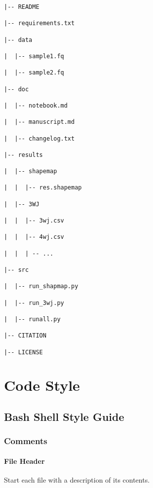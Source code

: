 \documentclass[
]{book}
\begin{document}
\begin{verbatim}
|-- README

|-- requirements.txt

|-- data

|  |-- sample1.fq

|  |-- sample2.fq

|-- doc

|  |-- notebook.md

|  |-- manuscript.md

|  |-- changelog.txt

|-- results

|  |-- shapemap

|  |  |-- res.shapemap

|  |-- 3WJ

|  |  |-- 3wj.csv

|  |  |-- 4wj.csv

|  |  | -- ...

|-- src

|  |-- run_shapmap.py

|  |-- run_3wj.py

|  |-- runall.py

|-- CITATION

|-- LICENSE
\end{verbatim}

\hypertarget{part-code-style}{%
\part*{Code Style}\label{part-code-style}}

\hypertarget{bash-shell-style-guide}{%
\chapter{Bash Shell Style Guide}\label{bash-shell-style-guide}}

\hypertarget{comments}{%
\section{Comments}\label{comments}}

\hypertarget{file-header}{%
\subsection{File Header}\label{file-header}}

Start each file with a description of its contents.
\end{document}
